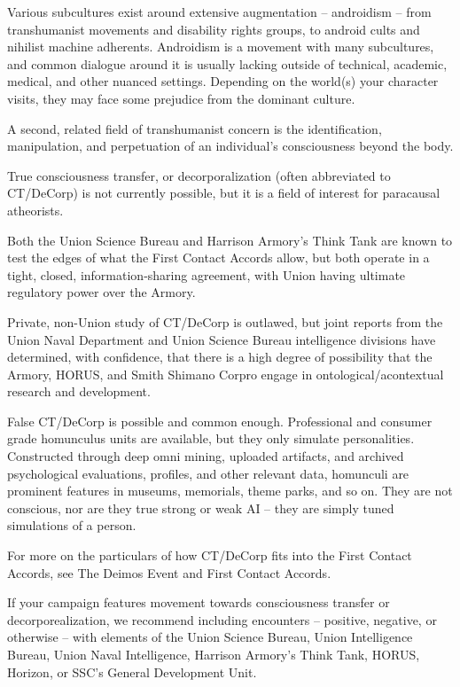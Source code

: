 Various subcultures exist around extensive augmentation -- androidism -- from transhumanist
movements and disability rights groups, to android cults and nihilist machine adherents.
Androidism is a movement with many subcultures, and common dialogue around it is usually
lacking outside of technical, academic, medical, and other nuanced settings. Depending on the
world(s) your character visits, they may face some prejudice from the dominant culture.


A second, related field of transhumanist concern is the identification, manipulation, and
perpetuation of an individual’s consciousness beyond the body.


True consciousness transfer, or decorporalization (often abbreviated to CT/DeCorp) is not
currently possible, but it is a field of interest for paracausal atheorists.

Both the Union Science Bureau and Harrison Armory’s Think Tank are known to test the edges of
what the First Contact Accords allow, but both operate in a tight, closed, information-sharing
agreement, with Union having ultimate regulatory power over the Armory.


Private, non-Union study of CT/DeCorp is outlawed, but joint reports from the Union Naval
Department and Union Science Bureau intelligence divisions have determined, with confidence,
that there is a high degree of possibility that the Armory, HORUS, and Smith Shimano Corpro
engage in ontological/acontextual research and development.


False CT/DeCorp is possible and common enough. Professional and consumer grade
homunculus units are available, but they only simulate personalities. Constructed through deep
omni mining, uploaded artifacts, and archived psychological evaluations, profiles, and other
relevant data, homunculi are prominent features in museums, memorials, theme parks, and so
on. They are not conscious, nor are they true strong or weak AI -- they are simply tuned
simulations of a person.


For more on the particulars of how CT/DeCorp fits into the First Contact Accords, see The
Deimos Event and First Contact Accords.


If your campaign features movement towards consciousness transfer or decorporealization, we
recommend including encounters -- positive, negative, or otherwise -- with elements of the
Union Science Bureau, Union Intelligence Bureau, Union Naval Intelligence, Harrison Armory’s
Think Tank, HORUS, Horizon, or SSC’s General Development Unit.





